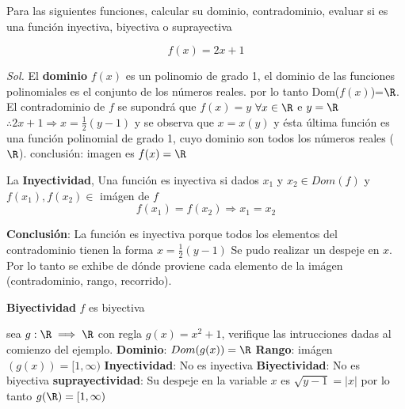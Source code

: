 \begin{example}
	Para las siguientes funciones, calcular su dominio, contradominio, evaluar si es una función inyectiva, biyectiva o suprayectiva

	\begin{equation*}
		f(x)=2x+1
	\end{equation*}

	\textit{ Sol. }
	El \textbf{dominio} $f(x)$ es un polinomio de grado 1, el dominio de las funciones polinomiales es el conjunto de los números reales. por lo tanto Dom($f(x)$)=$\R$.
	El contradominio de $f$ se supondrá que $f(x)=y$ $\forall x \in \R$ e $y=\R$
	$\therefore 2x+1\Longrightarrow x=\frac{1}{2} \left( y-1 \right)$ y se observa que $x=x(y)$ y ésta última función es una función polinomial de grado 1, cuyo dominio son todos los números reales ($\R$).
	conclusión: imagen es $f(x)=\R $

	La \textbf{Inyectividad}, Una función es inyectiva si dados $x_{1}$ y $x_{2} \in Dom(f)$ y $f(x_{1}), f(x_{2}) \in$ imágen de $f$
	\begin{equation*}
		f(x_{1})=f(x_{2}) \Longrightarrow x_1= x_{2}
	\end{equation*}

	\textbf{Conclusión}: La función es inyectiva porque todos los elementos del contradominio tienen la forma $x=\frac{1}{2} \left( y-1 \right)$
	Se pudo realizar un despeje en $x$. Por lo tanto se exhibe de dónde proviene cada elemento de la imágen (contradominio, rango, recorrido).

	\textbf{Biyectividad} $f$ es biyectiva

\end{example}

\begin{example}
	sea $g:\R\implies \R$ con regla $g(x)=x^2 +1$, verifique las intrucciones dadas al comienzo del ejemplo.
	\textbf{Dominio}: $Dom(g(x))=\R$
	\textbf{Rango}: imágen$(g(x))= [1,\infty)$
	\textbf{Inyectividad}: No es inyectiva
	\textbf{Biyectividad}: No es biyectiva
	\textbf{suprayectividad}: Su despeje en la variable $x$ es $\sqrt{y-1}=\left\lvert x\right\rvert$ por lo tanto $g(\R)=[1,\infty)$
\end{example}


